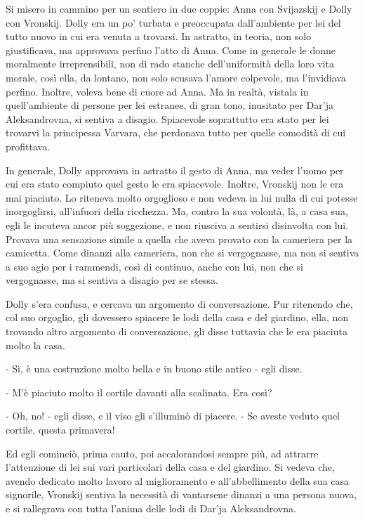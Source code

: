 Si misero in cammino per un sentiero in due coppie: Anna con Svijazskij e Dolly con Vronskij. Dolly era un po' turbata e preoccupata dall'ambiente per lei del tutto nuovo in cui era venuta a trovarsi. In astratto, in teoria, non solo giustificava, ma approvava perfino l'atto di Anna. Come in generale le donne moralmente irreprensibili, non di rado stanche dell'uniformità della loro vita morale, così ella, da lontano, non solo scusava l'amore colpevole, ma l'invidiava perfino. Inoltre, voleva bene di cuore ad Anna. Ma in realtà, vistala in quell'ambiente di persone per lei estranee, di gran tono, inusitato per Dar'ja Aleksandrovna, si sentiva a disagio. Spiacevole soprattutto era stato per lei trovarvi la principessa Varvara, che perdonava tutto per quelle comodità di cui profittava. 

In generale, Dolly approvava in astratto il gesto di Anna, ma veder l'uomo per cui era stato compiuto quel gesto le era spiacevole. Inoltre, Vronskij non le era mai piaciuto. Lo riteneva molto orgoglioso e non vedeva in lui nulla di cui potesse inorgoglirsi, all'infuori della ricchezza. Ma, contro la sua volontà, là, a casa sua, egli le incuteva ancor più soggezione, e non riusciva a sentirsi disinvolta con lui. Provava una sensazione simile a quella che aveva provato con la cameriera per la camicetta. Come dinanzi alla cameriera, non che si vergognasse, ma non si sentiva a suo agio per i rammendi, così di continuo, anche con lui, non che si vergognasse, ma si sentiva a disagio per se stessa. 

Dolly s'era confusa, e cercava un argomento di conversazione. Pur ritenendo che, col suo orgoglio, gli dovessero spiacere le lodi della casa e del giardino, ella, non trovando altro argomento di conversazione, gli disse tuttavia che le era piaciuta molto la casa. 

- Sì, è una costruzione molto bella e in buono stile antico - egli disse. 

- M'è piaciuto molto il cortile davanti alla scalinata. Era così? 

- Oh, no! - egli disse, e il viso gli s'illuminò di piacere. - Se aveste veduto quel cortile, questa primavera! 

Ed egli cominciò, prima cauto, poi accalorandosi sempre più, ad attrarre l'attenzione di lei sui vari particolari della casa e del giardino. Si vedeva che, avendo dedicato molto lavoro al miglioramento e all'abbellimento della sua casa signorile, Vronskij sentiva la necessità di vantarsene dinanzi a una persona nuova, e si rallegrava con tutta l'anima delle lodi di Dar'ja Aleksandrovna. 

